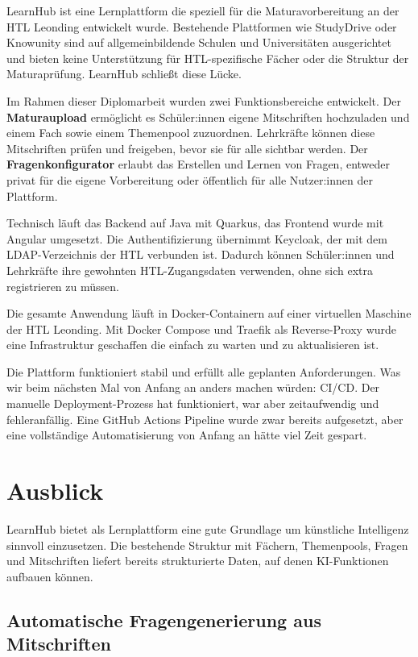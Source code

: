 LearnHub ist eine Lernplattform die speziell für die 
Maturavorbereitung an der HTL Leonding entwickelt wurde. 
Bestehende Plattformen wie StudyDrive oder Knowunity sind 
auf allgemeinbildende Schulen und Universitäten ausgerichtet 
und bieten keine Unterstützung für HTL-spezifische Fächer 
oder die Struktur der Maturaprüfung. LearnHub schließt 
diese Lücke.

Im Rahmen dieser Diplomarbeit wurden zwei Funktionsbereiche 
entwickelt. Der \textbf{Maturaupload} ermöglicht es 
Schüler:innen eigene Mitschriften hochzuladen und einem 
Fach sowie einem Themenpool zuzuordnen. Lehrkräfte können 
diese Mitschriften prüfen und freigeben, bevor sie für alle 
sichtbar werden. Der \textbf{Fragenkonfigurator} erlaubt 
das Erstellen und Lernen von Fragen, entweder privat für 
die eigene Vorbereitung oder öffentlich für alle 
Nutzer:innen der Plattform.

Technisch läuft das Backend auf Java mit Quarkus, das 
Frontend wurde mit Angular umgesetzt. Die Authentifizierung 
übernimmt Keycloak, der mit dem LDAP-Verzeichnis der HTL 
verbunden ist. Dadurch können Schüler:innen und Lehrkräfte 
ihre gewohnten HTL-Zugangsdaten verwenden, ohne sich extra 
registrieren zu müssen.

Die gesamte Anwendung läuft in Docker-Containern auf einer 
virtuellen Maschine der HTL Leonding. Mit Docker Compose 
und Traefik als Reverse-Proxy wurde eine Infrastruktur 
geschaffen die einfach zu warten und zu aktualisieren ist.

Die Plattform funktioniert stabil und erfüllt alle geplanten 
Anforderungen. Was wir beim nächsten Mal von Anfang an 
anders machen würden: CI/CD. Der manuelle Deployment-Prozess 
hat funktioniert, war aber zeitaufwendig und fehleranfällig. 
Eine GitHub Actions Pipeline wurde zwar bereits aufgesetzt, 
aber eine vollständige Automatisierung von Anfang an hätte 
viel Zeit gespart.

\section{Ausblick}

LearnHub bietet als Lernplattform eine gute Grundlage um künstliche 
Intelligenz sinnvoll einzusetzen. Die bestehende Struktur mit Fächern, 
Themenpools, Fragen und Mitschriften liefert bereits strukturierte 
Daten, auf denen KI-Funktionen aufbauen können.

\subsection{Automatische Fragengenerierung aus Mitschriften}

